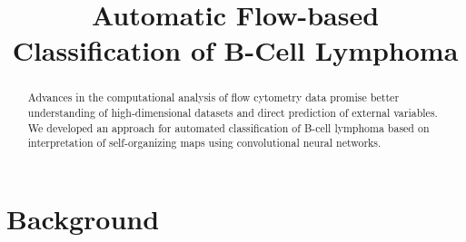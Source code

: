 \documentclass[11pt,a4paper]{article}
\begin{document}
\title{Automatic Flow-based Classification of B-Cell Lymphoma}


\begin{abstract}
   Advances in the computational analysis of flow cytometry data promise better understanding of high-dimensional datasets and direct prediction of external variables.
   We developed an approach for automated classification of B-cell lymphoma based on interpretation of self-organizing maps using convolutional neural networks.
\end{abstract}


\section{Background}





\end{document}
